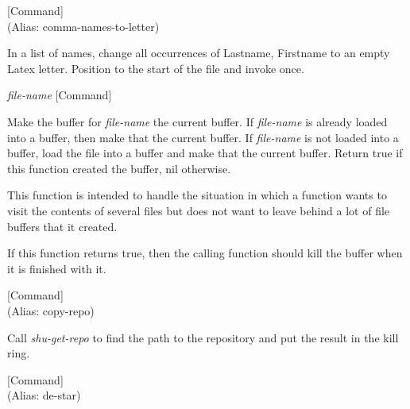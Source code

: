 \vspace{1em}
\noindent
{}
\usebox{\funcname}
 \hfill [Command]\\%
 (Alias: comma-names-to-letter)

\begin{doc-string}
In a list of names, change all occurrences
of Lastname, Firstname to an empty Latex letter.
Position to the start of the file and invoke once.
\end{doc-string}

\vspace{1em}
\noindent
{}
\usebox{\funcname}\emph{file-name}
 \hfill [Command]

\begin{doc-string}
Make the buffer for \emph{file-name} the current buffer.  If \emph{file-name} is already
loaded into a buffer, then make that the current buffer.  If \emph{file-name} is not
loaded into a buffer, load the file into a buffer and make that the current
buffer.  Return true if this function created the buffer, nil otherwise.

This function is intended to handle the situation in which a function wants
to visit the contents of several files but does not want to leave behind a
lot of file buffers that it created.

If this function returns true, then the calling function should kill the
buffer when it is finished with it.
\end{doc-string}

\vspace{1em}
\noindent
{}
\usebox{\funcname}
 \hfill [Command]\\%
 (Alias: copy-repo)

\begin{doc-string}
Call \emph{shu-get-repo} to find the path to the repository and put the result in
the kill ring.
\end{doc-string}

\vspace{1em}
\noindent
{}
\usebox{\funcname}
 \hfill [Command]\\%
 (Alias: de-star)

